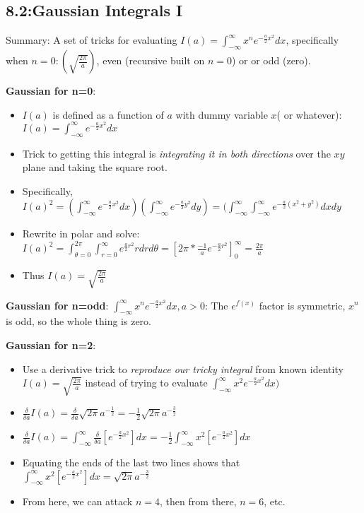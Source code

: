\documentclass[11pt, oneside]{article}   	%
\begin{document}
\subsection{8.2:Gaussian Integrals I}

Summary: A set of tricks for evaluating $I(a) = \int_{-\infty}^{\infty} x^n e^{-\frac{a}{2} x^2} dx$, specifically when $n=0: (\sqrt{\frac{2\pi}{a}})$, even (recursive built on $n=0$) or or odd (zero).

\textbf{Gaussian for n=0}:
\begin{itemize}
\item $I(a)$ is defined as a function of $a$ with dummy variable $x$( or whatever):  $I(a)= \int_{-\infty}^{\infty} e^{-\frac{a}{2} x^2} dx$
\item Trick to getting this integral is \emph{integrating it in both directions} over the $xy$ plane and taking the square root.
\item Specifically, $I(a)^2 = (\int_{-\infty}^{\infty} e^{-\frac{a}{2} x^2}dx)(\int_{-\infty}^{\infty} e^{-\frac{a}{2} y^2}dy) = (\int_{-\infty}^{\infty} \int_{-\infty}^{\infty} e^{-\frac{a}{2} (x^2+y^2)}dx dy$
\item Rewrite in polar and solve: $I(a)^2 = \int_{\theta = 0}^{2\pi}\int_{r=0}^{\infty} e^{\frac{a}{2}r^2}rdrd\theta = [2\pi * \frac{-1}{a}e^{-\frac{a}{2}r^2}]_0^{\infty} = \frac{2\pi}{a}$
\item Thus $I(a)= \sqrt{ \frac{2\pi}{a}}$
\end{itemize}

\textbf{Gaussian for n=odd}: $\int_{-\infty}^{\infty}x^ne^{-\frac{a}{2}x^2} dx, a >0$: The $e^{f(x)}$ factor is symmetric, $x^n$ is odd, so the whole thing is zero.

\textbf{Gaussian for n=2}: 
\begin{itemize}
\item Use a derivative trick to \emph{reproduce our tricky integral} from known identity $I(a) = \sqrt{\frac{2\pi}{a}}$ instead of trying to evaluate $\int_{-\infty}^{\infty} x^2 e^{-\frac{a}{2} x^2}dx)$
\item $\frac{\delta}{\delta a} I(a) = \frac{\delta}{\delta a} \sqrt{2\pi}a^{-\frac{1}{2}} = -\frac{1}{2}\sqrt{2\pi}a^{-\frac{3}{2}}$
\item $\frac{\delta}{\delta a} I(a) = \int_{-\infty}^{\infty} \frac{\delta}{\delta a} [e^{-\frac{a}{2}x^2}] dx = -\frac{1}{2} \int_{-\infty}^{\infty} x^2 [e^{-\frac{a}{2}x^2}] dx$
\item Equating the ends of the last two lines shows that $\int_{-\infty}^{\infty} x^2 [e^{-\frac{a}{2}x^2}] dx = \sqrt{2\pi}a^{-\frac{3}{2}}$
\item From here, we can attack $n=4$, then from there, $n=6$, etc.
\end{itemize}
\end{document}
